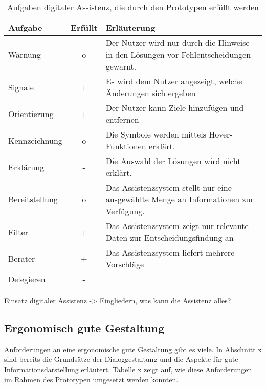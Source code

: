 \begin{table}
\centering
\begin{tabular}{l|c|p{}}
\textbf{Aufgabe} & \textbf{Erfüllt} & \textbf{Erläuterung} \\
\hline
Warnung & o & Der Nutzer wird nur durch die Hinweise in den Lösungen vor Fehlentscheidungen gewarnt.\\
\hline
Signale & + & Es wird dem Nutzer angezeigt, welche Änderungen sich ergeben\\
\hline
Orientierung & + & Der Nutzer kann Ziele hinzufügen und entfernen \\
\hline
Kennzeichnung & o & Die Symbole werden mittels Hover-Funktionen erklärt.\\
\hline
Erklärung & - & Die Auswahl der Lösungen wird nicht erklärt.\\
\hline
Bereitstellung & o & Das Assistenzsystem stellt nur eine ausgewählte Menge an Informationen zur Verfügung.\\
\hline
Filter & + & Das Assistenzsystem zeigt nur relevante Daten zur Entscheidungsfindung an \\
\hline
Berater & + & Das Assistenzsystem liefert mehrere Vorschläge \\
\hline
Delegieren & - & \\
\end{tabular}
\caption{Aufgaben digitaler Assistenz, die durch den Prototypen erfüllt werden}
\end{table}

Einsatz digitaler Assistenz -> Eingliedern, was kann die Assistenz alles?

\subsection*{Ergonomisch gute Gestaltung}
Anforderungen an eine ergonomische gute Gestaltung gibt es viele. In Abschnitt x sind bereits die Grundsätze der Dialoggestaltung und die Aspekte für gute Informationsdarstellung erläutert. Tabelle x zeigt auf, wie diese Anforderungen im Rahmen des Prototypen umgesetzt werden konnten.

